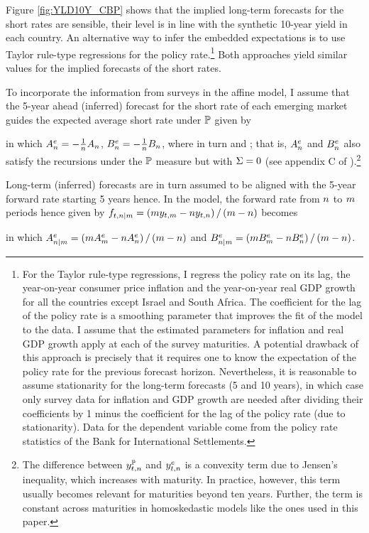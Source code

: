 {Figure \ref{fig:YLD10Y_CBP} shows that the implied long-term forecasts for the short rates are sensible, their level is in line with the synthetic 10-year yield in each country. 
An alternative way to infer the embedded expectations is to use Taylor rule-type regressions for the policy rate.\footnote{For the Taylor rule-type regressions, I regress the policy rate on its lag, the year-on-year consumer price inflation and the year-on-year real GDP growth for all the countries except Israel and South Africa. The coefficient for the lag of the policy rate is a smoothing parameter that improves the fit of the model to the data. I assume that the estimated parameters for inflation and real GDP growth apply at each of the survey maturities. A potential drawback of this approach is precisely that it requires one to know the expectation of the policy rate for the previous forecast horizon. Nevertheless, it is reasonable to assume stationarity for the long-term forecasts (5 and 10 years), in which case only survey data for inflation and GDP growth are needed after dividing their coefficients by 1 minus the coefficient for the lag of the policy rate (due to stationarity). Data for the dependent variable come from the policy rate statistics of the Bank for International Settlements.}
Both approaches yield similar values for the implied forecasts of the short rates. %



To incorporate the information from surveys in the affine model, I assume that the 5-year ahead (inferred) forecast for the short rate of each emerging market guides the expected average short rate under \(\mathbb{P}\) given by 

\noindent in which \(A_{n}^{e} = - \frac{1}{n} A_{n}\), \(B_{n}^{e} = - \frac{1}{n} B_{n}\), where in turn \!and \!\!; that is, \(A_{n}^{e}\) and \(B_{n}^{e}\) also satisfy the recursions under the \(\mathbb{P}\) measure but with \(\Sigma = 0\) (see appendix C of \cite{Guimaraes:2014}).\footnote{ The difference between \(y_{t,n}^{\mathbb{P}}\) and \(y_{t,n}^{e}\) is a convexity term due to Jensen's inequality, which increases with maturity. In practice, however, this term usually becomes relevant for maturities beyond ten years. Further, the term is constant across maturities in homoskedastic models like the ones used in this paper.}

Long-term (inferred) forecasts are in turn assumed to be aligned with the 5-year forward rate starting 5 years hence. 
In the model, the forward rate from \(n\) to \(m\) periods hence given by \(f_{t,n | m} = \left( m y_{t,m} - n y_{t,n} \right)/ \left( m - n \right)\) becomes 

\noindent in which \(A_{n | m}^{e} = \left( m A_{m}^{e} - n A_{n}^{e} \right)/ \left( m - n \right)\)  and \(B_{n | m}^{e} = \left( m B_{m}^{e} - n B_{n}^{e} \right)/ \left( m - n \right)\).


}
